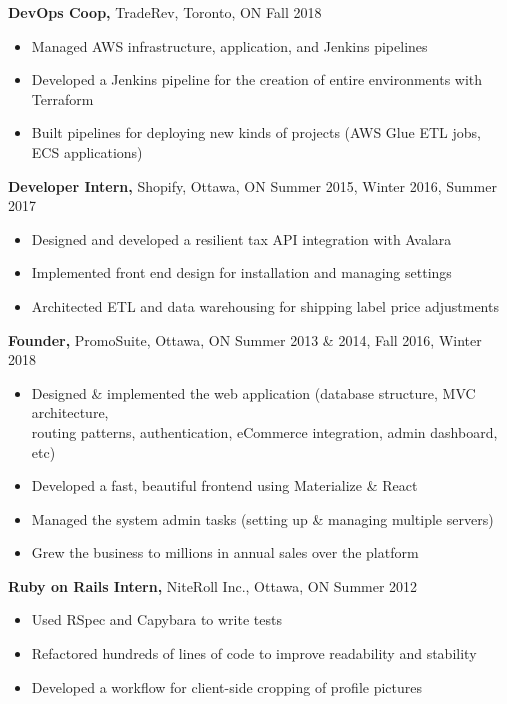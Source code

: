 \documentclass[line, centered]{res}
\begin{document}
\begin{resume}
 {\bf DevOps Coop,} TradeRev, Toronto, ON \hfill Fall 2018\\[-8pt]
 \begin{itemize} \itemsep -2pt  %
    \item Managed AWS infrastructure, application, and Jenkins pipelines
    \item Developed a Jenkins pipeline for the creation of entire environments with Terraform
    \item Built pipelines for deploying new kinds of projects (AWS Glue ETL jobs, ECS applications)
 \end{itemize}

 {\bf Developer Intern,} Shopify, Ottawa, ON \hfill Summer 2015, Winter 2016, Summer 2017\\[-8pt]
 \begin{itemize} \itemsep -2pt  %
    \item Designed and developed a resilient tax API integration with Avalara
    \item Implemented front end design for installation and managing settings
    \item Architected ETL and data warehousing for shipping label price adjustments
 \end{itemize}

 {\bf Founder,} PromoSuite, Ottawa, ON \hfill Summer 2013 \& 2014, Fall 2016, Winter 2018\\[-8pt]
 \begin{itemize} \itemsep -2pt  %
    \item Designed \& implemented the web application (database structure, MVC architecture,\\
            routing patterns, authentication, eCommerce integration, admin dashboard, etc)
    \item Developed a fast, beautiful frontend using Materialize \& React
    \item Managed the system admin tasks (setting up \& managing multiple servers)
    \item Grew the business to millions in annual sales over the platform
 \end{itemize}


{\bf Ruby on Rails Intern,} NiteRoll Inc., Ottawa, ON \hfill Summer 2012\\[-8pt]
\begin{itemize} \itemsep -2pt
	\item Used RSpec and Capybara to write tests
    \item Refactored hundreds of lines of code to improve readability and stability
    \item Developed a workflow for client-side cropping of profile pictures
\end{itemize}



\end{resume}
\end{document}
